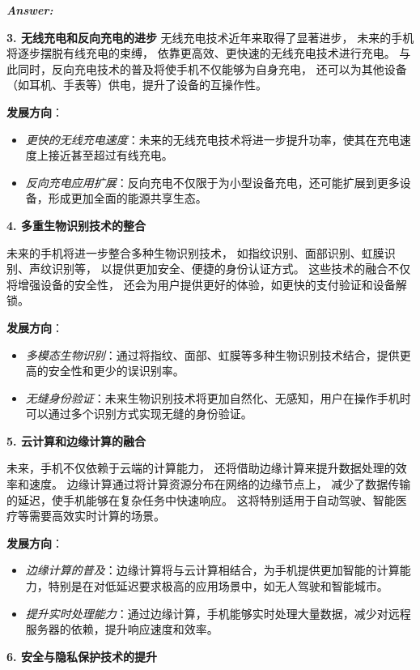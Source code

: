 \documentclass[12pt]{article}
\newenvironment{Answer}{
  \vspace{12pt}
  {\large\textbf{\textit{\hspace{-12pt}Answer:}}}\par
  \vspace{8pt}
} {\vspace{24pt}}
\begin{document}
\begin{Answer}
\noindent\textbf{3. 无线充电和反向充电的进步}\noindent
无线充电技术近年来取得了显著进步，
未来的手机将逐步摆脱有线充电的束缚，
依靠更高效、更快速的无线充电技术进行充电。
与此同时，反向充电技术的普及将使手机不仅能够为自身充电，
还可以为其他设备（如耳机、手表等）供电，提升了设备的互操作性。

\textbf{发展方向}：
\begin{itemize}
    \item \textit{更快的无线充电速度}：未来的无线充电技术将进一步提升功率，使其在充电速度上接近甚至超过有线充电。
    \item \textit{反向充电应用扩展}：反向充电不仅限于为小型设备充电，还可能扩展到更多设备，形成更加全面的能源共享生态。
\end{itemize}

\noindent\textbf{4. 多重生物识别技术的整合}\noindent

未来的手机将进一步整合多种生物识别技术，
如指纹识别、面部识别、虹膜识别、声纹识别等，
以提供更加安全、便捷的身份认证方式。
这些技术的融合不仅将增强设备的安全性，
还会为用户提供更好的体验，如更快的支付验证和设备解锁。

\textbf{发展方向}：
\begin{itemize}
    \item \textit{多模态生物识别}：通过将指纹、面部、虹膜等多种生物识别技术结合，提供更高的安全性和更少的误识别率。
    \item \textit{无缝身份验证}：未来生物识别技术将更加自然化、无感知，用户在操作手机时可以通过多个识别方式实现无缝的身份验证。
\end{itemize}

\noindent\textbf{5. 云计算和边缘计算的融合}\noindent

未来，手机不仅依赖于云端的计算能力，
还将借助边缘计算来提升数据处理的效率和速度。
边缘计算通过将计算资源分布在网络的边缘节点上，
减少了数据传输的延迟，使手机能够在复杂任务中快速响应。
这将特别适用于自动驾驶、智能医疗等需要高效实时计算的场景。

\textbf{发展方向}：
\begin{itemize}
    \item \textit{边缘计算的普及}：边缘计算将与云计算相结合，为手机提供更加智能的计算能力，特别是在对低延迟要求极高的应用场景中，如无人驾驶和智能城市。
    \item \textit{提升实时处理能力}：通过边缘计算，手机能够实时处理大量数据，减少对远程服务器的依赖，提升响应速度和效率。
\end{itemize}

\noindent\textbf{6. 安全与隐私保护技术的提升}\noindent


\end{Answer}
\end{document}
